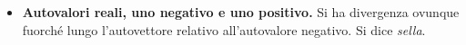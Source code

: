 \documentclass[10pt,a4paper]{book}
\begin{document}
\begin{itemize}
\begin{figure}[htpb]
\begin{tikzpicture}[x=0.75pt,y=0.75pt,yscale=-1,xscale=1]
	      		
	      	\end{tikzpicture}
	      \end{figure}\FloatBarrier
	      
	\item \textbf{Autovalori reali, uno negativo e uno positivo.} Si ha divergenza ovunque fuorché lungo l'autovettore relativo all'autovalore negativo. Si dice \textit{sella}.
	      
	      \begin{figure}[htpb]\centering
	      	
	      	\begin{tikzpicture}[x=0.75pt,y=0.75pt,yscale=-1,xscale=1]
	      		

\end{tikzpicture}
\end{figure}
\end{itemize}
\end{document}
